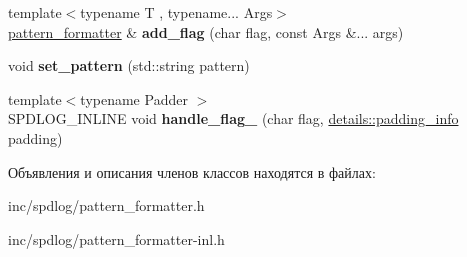\begin{DoxyCompactItemize}
{\footnotesize template$<$typename T , typename... Args$>$ }\\\hyperlink{classspdlog_1_1pattern__formatter}{pattern\+\_\+formatter} \& {\bfseries add\+\_\+flag} (char flag, const Args \&... args)
\item 
\mbox{\label{classspdlog_1_1pattern__formatter_a374b378153d64904c26affa5741b24b2}} 
void {\bfseries set\+\_\+pattern} (std\+::string pattern)
\item 
\mbox{\label{classspdlog_1_1pattern__formatter_a9d2a0b143720da0d1ead8a93eacd56f0}} 
{\footnotesize template$<$typename Padder $>$ }\\S\+P\+D\+L\+O\+G\+\_\+\+I\+N\+L\+I\+NE void {\bfseries handle\+\_\+flag\+\_\+} (char flag, \hyperlink{structspdlog_1_1details_1_1padding__info}{details\+::padding\+\_\+info} padding)
\end{DoxyCompactItemize}


Объявления и описания членов классов находятся в файлах\+:\begin{DoxyCompactItemize}
\item 
inc/spdlog/pattern\+\_\+formatter.\+h\item 
inc/spdlog/pattern\+\_\+formatter-\/inl.\+h\end{DoxyCompactItemize}

